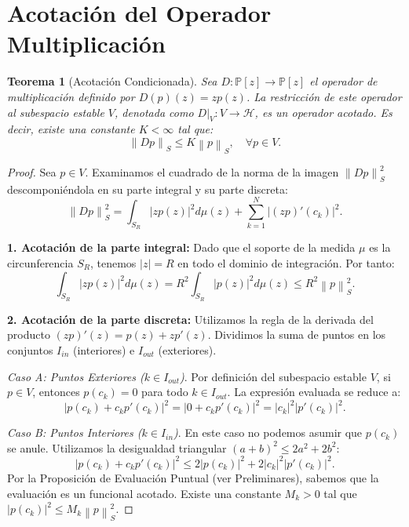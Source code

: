 \documentclass[12pt,a4paper]{article}
\newtheorem{teorema}{Teorema}
\theoremstyle{definition}
\theoremstyle{remark}
\newcommand{\Poly}{\mathbb{P}[z]}
\newcommand{\norm}[1]{\left\| #1 \right\|_S}
\newcommand{\abs}[1]{\left| #1 \right|}
\begin{document}
\section{Acotación del Operador Multiplicación}

\begin{teorema}[Acotación Condicionada]
    Sea $D: \Poly \to \Poly$ el operador de multiplicación definido por $D(p)(z) = z p(z)$. La restricción de este operador al subespacio estable $V$, denotada como $D|_V : V \to \mathcal{H}$, es un operador acotado. Es decir, existe una constante $K < \infty$ tal que:
    $$ \norm{Dp} \leq K \norm{p}, \quad \forall p \in V. $$
\end{teorema}

\begin{proof}
    Sea $p \in V$. Examinamos el cuadrado de la norma de la imagen $\norm{Dp}^2$ descomponiéndola en su parte integral y su parte discreta:
    $$ \norm{Dp}^2 = \int_{S_R} \abs{z p(z)}^2 d\mu(z) + \sum_{k=1}^{N} \abs{(zp)'(c_k)}^2. $$

    \textbf{1. Acotación de la parte integral:}
    Dado que el soporte de la medida $\mu$ es la circunferencia $S_R$, tenemos $\abs{z} = R$ en todo el dominio de integración. Por tanto:
    $$ \int_{S_R} \abs{z p(z)}^2 d\mu(z) = R^2 \int_{S_R} \abs{p(z)}^2 d\mu(z) \leq R^2 \norm{p}^2. $$

    \textbf{2. Acotación de la parte discreta:}
    Utilizamos la regla de la derivada del producto $(zp)'(z) = p(z) + z p'(z)$. Dividimos la suma de puntos en los conjuntos $I_{in}$ (interiores) e $I_{out}$ (exteriores).

    \textit{Caso A: Puntos Exteriores ($k \in I_{out}$)}.
    Por definición del subespacio estable $V$, si $p \in V$, entonces $p(c_k) = 0$ para todo $k \in I_{out}$. La expresión evaluada se reduce a:
    $$ \abs{p(c_k) + c_k p'(c_k)}^2 = \abs{0 + c_k p'(c_k)}^2 = \abs{c_k}^2 \abs{p'(c_k)}^2. $$

    \textit{Caso B: Puntos Interiores ($k \in I_{in}$)}.
    En este caso no podemos asumir que $p(c_k)$ se anule. Utilizamos la desigualdad triangular $(a+b)^2 \leq 2a^2 + 2b^2$:
    $$ \abs{p(c_k) + c_k p'(c_k)}^2 \leq 2\abs{p(c_k)}^2 + 2\abs{c_k}^2 \abs{p'(c_k)}^2. $$
    Por la Proposición de Evaluación Puntual (ver Preliminares), sabemos que la evaluación es un funcional acotado. Existe una constante $M_k > 0$ tal que $\abs{p(c_k)}^2 \leq M_k \norm{p}^2$.


\end{proof}
\end{document}
